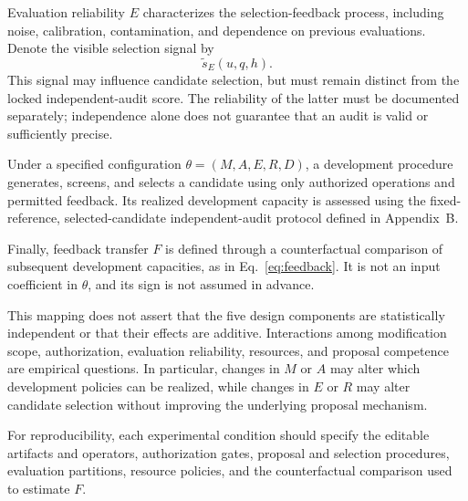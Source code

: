\documentclass[11pt,a4paper]{article}
\begin{document}
Evaluation reliability $E$ characterizes the
selection-feedback process, including noise,
calibration, contamination, and dependence on
previous evaluations. Denote the visible
selection signal by
\[
\widetilde{s}_{E}(u,q,h).
\]
This signal may influence candidate selection, but must remain distinct from the locked independent-audit score. The reliability of the latter must be documented separately; independence alone does not guarantee that an audit is valid or sufficiently precise.

Under a specified configuration $\theta=(M,A,E,R,D)$, a development procedure generates, screens, and selects a candidate using only authorized operations and permitted feedback. Its realized development capacity is assessed using the fixed-reference, selected-candidate independent-audit protocol defined in Appendix~B.

Finally, feedback transfer $F$ is defined through a counterfactual comparison of subsequent development capacities, as in Eq.~\eqref{eq:feedback}. It is not an input coefficient in $\theta$, and its sign is not assumed in advance.

This mapping does not assert that the five design components are statistically independent or that their effects are additive. Interactions among modification scope, authorization, evaluation reliability, resources, and proposal competence are empirical questions. In particular, changes
in $M$ or $A$ may alter which development policies can be realized, while changes in $E$ or $R$ may alter candidate selection without improving the underlying proposal mechanism.

For reproducibility, each experimental condition should specify the editable artifacts and operators, authorization gates, proposal and selection procedures, evaluation partitions, resource policies, and the counterfactual comparison used to estimate $F$.
\end{document}
